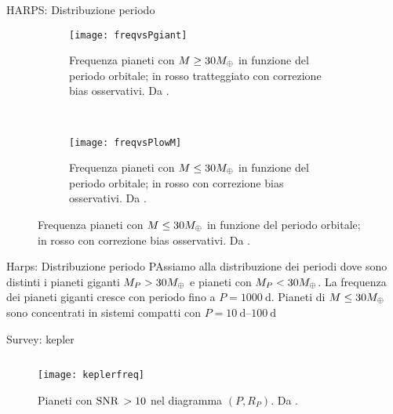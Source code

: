 \begin{frame}{HARPS: Distribuzione periodo}
\begin{figure}[!ht]
\begin{subfigure}[b]{0.45\textwidth} \centering \texttt{[image: freqvsPgiant]}\caption{Frequenza pianeti con $M\geq 30M_{\oplus}{}$ in funzione del periodo orbitale; in rosso  tratteggiato con correzione bias osservativi. Da \cite{mayor2011harps}.}\label{fig:freqvsPgiant} \end{subfigure}
~
\begin{subfigure}[b]{0.45\textwidth} \centering \texttt{[image: freqvsPlowM]} \caption{Frequenza pianeti con $M\leq 30M_{\oplus}{}$ in funzione del periodo orbitale; in rosso con correzione bias osservativi. Da \cite{mayor2011harps}.}\label{fig:freqvsPlowM}
\end{subfigure}
\end{figure}
\end{frame}

\begin{wordonframe}{Harps: Distribuzione periodo}
PAssiamo alla distribuzione dei periodi dove sono distinti i pianeti giganti $M_P>30M_{\oplus}{}$ e pianeti con $M_P<30M_{\oplus}{}$.
La frequenza dei pianeti giganti cresce con periodo fino a $P=\SI{1000}{\day}$. Pianeti di $M\leq30M_{\oplus}{}$ sono concentrati in sistemi compatti con $P=\SIrange{10}{100}{\day}$
\end{wordonframe}

\begin{frame}{Survey: kepler}
\begin{figure}[!ht]
	\begin{columns}[T]
\begin{column}{0.65\textwidth}
	\centering \texttt{[image: keplerfreq]}
\end{column}
\begin{column}{0.35\textwidth}
\caption{Pianeti con $\operatorname{SNR}{}>10$ nel diagramma $(P,R_P)$. Da \cite{howard2012planet}.}\label{fig:keplerfreq}
\end{column}
	\end{columns}

\end{figure}
\end{frame}

